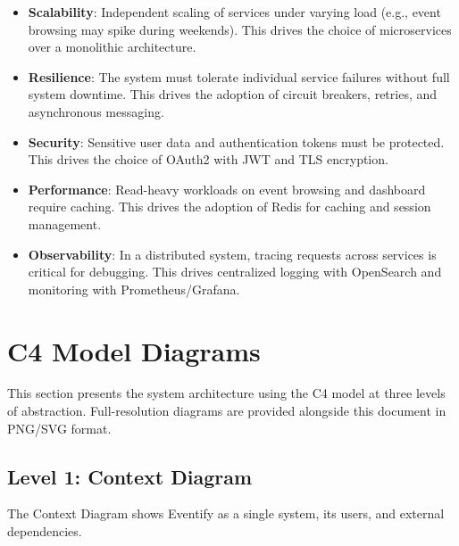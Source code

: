 \documentclass[12pt,a4paper]{article}
\begin{document}
\begin{itemize}
    \item \textbf{Scalability}: Independent scaling of services under varying load (e.g., event browsing may spike during weekends). This drives the choice of microservices over a monolithic architecture.
    \item \textbf{Resilience}: The system must tolerate individual service failures without full system downtime. This drives the adoption of circuit breakers, retries, and asynchronous messaging.
    \item \textbf{Security}: Sensitive user data and authentication tokens must be protected. This drives the choice of OAuth2 with JWT and TLS encryption.
    \item \textbf{Performance}: Read-heavy workloads on event browsing and dashboard require caching. This drives the adoption of Redis for caching and session management.
    \item \textbf{Observability}: In a distributed system, tracing requests across services is critical for debugging. This drives centralized logging with OpenSearch and monitoring with Prometheus/Grafana.
\end{itemize}

\newpage

\section{C4 Model Diagrams}

This section presents the system architecture using the C4 model at three levels of abstraction. Full-resolution diagrams are provided alongside this document in PNG/SVG format.

\subsection{Level 1: Context Diagram}

The Context Diagram shows Eventify as a single system, its users, and external dependencies.
\end{document}
